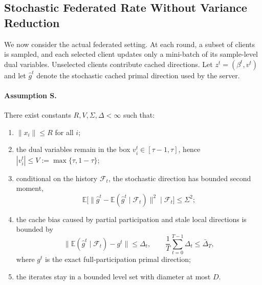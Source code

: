 \subsection{Stochastic Federated Rate Without Variance Reduction}

We now consider the actual federated setting. At each round, a subset of
clients is sampled, and each selected client updates only a mini-batch of its
sample-level dual variables. Unselected clients contribute cached directions.
Let $z^t=(\beta^t,v^t)$ and let $\widehat{g}^t$ denote the stochastic cached
primal direction used by the server.

\paragraph{Assumption S.}
There exist constants $R,V,\Sigma,\Delta<\infty$ such that:
\begin{enumerate}
    \item $\|x_i\|\le R$ for all $i$;
    \item the dual variables remain in the box
    $v_i^t\in[\tau-1,\tau]$, hence $|v_i^t|\le V:=\max\{\tau,1-\tau\}$;
    \item conditional on the history $\mathcal{F}_t$, the stochastic direction
    has bounded second moment,
    \begin{equation}
        \mathbb{E}\big[
        \|\widehat{g}^t-\mathbb{E}(\widehat{g}^t\mid\mathcal{F}_t)\|^2
        \mid\mathcal{F}_t
        \big]\le \Sigma^2;
        \label{eq:bounded-variance}
    \end{equation}
    \item the cache bias caused by partial participation and stale local
    directions is bounded by
    \begin{equation}
        \big\|
        \mathbb{E}(\widehat{g}^t\mid\mathcal{F}_t)-g^t
        \big\|
        \le \Delta_t,
        \qquad
        \frac{1}{T}\sum_{t=0}^{T-1}\Delta_t
        \le \bar{\Delta}_T ,
        \label{eq:stale-bias}
    \end{equation}
    where $g^t$ is the exact full-participation primal direction;
    \item the iterates stay in a bounded level set with diameter at most $D$.
\end{enumerate}

